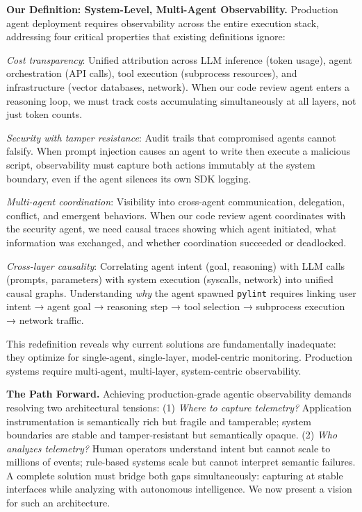 \documentclass[sigplan,screen,9pt]{acmart}
\begin{document}
\textbf{Our Definition: System-Level, Multi-Agent Observability.} Production agent deployment requires observability across the entire execution stack, addressing four critical properties that existing definitions ignore:

\emph{Cost transparency}: Unified attribution across LLM inference (token usage), agent orchestration (API calls), tool execution (subprocess resources), and infrastructure (vector databases, network). When our code review agent enters a reasoning loop, we must track costs accumulating simultaneously at all layers, not just token counts.

\emph{Security with tamper resistance}: Audit trails that compromised agents cannot falsify. When prompt injection causes an agent to write then execute a malicious script, observability must capture both actions immutably at the system boundary, even if the agent silences its own SDK logging.

\emph{Multi-agent coordination}: Visibility into cross-agent communication, delegation, conflict, and emergent behaviors. When our code review agent coordinates with the security agent, we need causal traces showing which agent initiated, what information was exchanged, and whether coordination succeeded or deadlocked.

\emph{Cross-layer causality}: Correlating agent intent (goal, reasoning) with LLM calls (prompts, parameters) with system execution (syscalls, network) into unified causal graphs. Understanding \emph{why} the agent spawned \texttt{pylint} requires linking user intent → agent goal → reasoning step → tool selection → subprocess execution → network traffic.

This redefinition reveals why current solutions are fundamentally inadequate: they optimize for single-agent, single-layer, model-centric monitoring. Production systems require multi-agent, multi-layer, system-centric observability.

\textbf{The Path Forward.} Achieving production-grade agentic observability demands resolving two architectural tensions: (1) \emph{Where to capture telemetry?} Application instrumentation is semantically rich but fragile and tamperable; system boundaries are stable and tamper-resistant but semantically opaque. (2) \emph{Who analyzes telemetry?} Human operators understand intent but cannot scale to millions of events; rule-based systems scale but cannot interpret semantic failures. A complete solution must bridge both gaps simultaneously: capturing at stable interfaces while analyzing with autonomous intelligence. We now present a vision for such an architecture.
\end{document}
